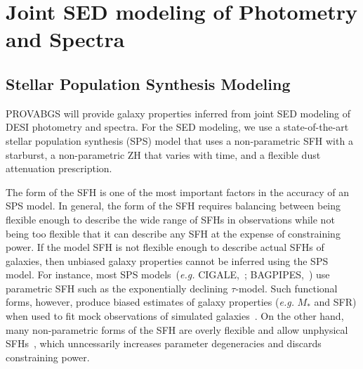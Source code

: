 \section{Joint SED modeling of Photometry and Spectra} \label{sec:methods}
\subsection{Stellar Population Synthesis Modeling} \label{sec:sps} 
PROVABGS will provide galaxy properties inferred from joint SED modeling of
DESI photometry and spectra. 
For the SED modeling, we use a state-of-the-art stellar population synthesis
(SPS) model that uses a non-parametric SFH with a starburst, a non-parametric
ZH that varies with time, and a flexible dust attenuation prescription. 

The form of the SFH is one of the most important factors in the accuracy of an
SPS model.
In general, the form of the SFH requires balancing between being flexible enough
to describe the wide range of SFHs in observations while not being too flexible
that it can describe any SFH at the expense of constraining power.  
If the model SFH is not flexible enough to describe actual SFHs of galaxies,
then unbiased galaxy properties cannot be inferred using the SPS model. 
For instance, most SPS models~(\emph{e.g.} CIGALE,~\citealt{serra2011,
boquien2019}; BAGPIPES,~\citealt{carnall2018}) use parametric SFH such as the
exponentially declining $\tau$-model.
Such functional forms, however, produce biased estimates of galaxy properties
(\emph{e.g.} $M_*$ and SFR) when used to fit mock observations of simulated 
galaxies~\citep{simha2014, pacifici2015, ciesla2017, carnall2018}.
On the other hand, many non-parametric forms of the SFH are overly flexible
and allow unphysical SFHs~\citep{leja2019}, which unncessarily increases 
parameter degeneracies and discards constraining power. 

